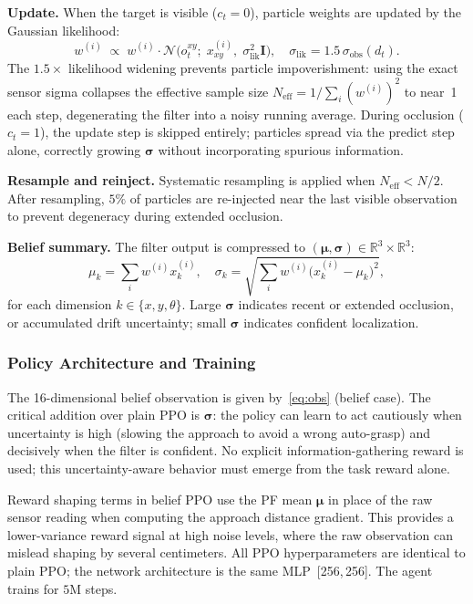 \documentclass[conference]{IEEEtran}
\newcommand{\sigmaobs}{\sigma_{\text{obs}}}
\begin{document}
\textbf{Update.}
When the target is visible ($c_t=0$), particle weights are updated by
the Gaussian likelihood:
\begin{equation}
  w^{(i)} \;\propto\; w^{(i)} \cdot
  \mathcal{N}\!\bigl(o_t^{xy};\;x^{(i)}_{xy},\;
    \sigma_{\text{lik}}^2\mathbf{I}\bigr),
  \quad \sigma_{\text{lik}} = 1.5\,\sigmaobs(d_t).
  \label{eq:pf_update}
\end{equation}
The $1.5\times$ likelihood widening prevents particle impoverishment:
using the exact sensor sigma collapses the effective sample size
$N_{\text{eff}}=1/\!\sum_i(w^{(i)})^2$ to near~1 each step, degenerating
the filter into a noisy running average.
During occlusion ($c_t=1$), the update step is skipped entirely;
particles spread via the predict step alone, correctly growing
$\bm{\sigma}$ without incorporating spurious information.

\textbf{Resample and reinject.}
Systematic resampling is applied when $N_{\text{eff}}<N/2$.
After resampling, $5\%$ of particles are re-injected near the last
visible observation to prevent degeneracy during extended occlusion.

\textbf{Belief summary.}
The filter output is compressed to
$(\bm{\mu},\bm{\sigma})\in\mathbb{R}^3\times\mathbb{R}^3$:
\begin{equation}
  \mu_k = \sum_i w^{(i)} x^{(i)}_k, \quad
  \sigma_k = \sqrt{\sum_i w^{(i)}\bigl(x^{(i)}_k - \mu_k\bigr)^2},
\end{equation}
for each dimension $k\in\{x,y,\theta\}$.
Large $\bm{\sigma}$ indicates recent or extended occlusion, or
accumulated drift uncertainty; small $\bm{\sigma}$ indicates confident
localization.

\subsubsection{Policy Architecture and Training}

The 16-dimensional belief observation is given by~\eqref{eq:obs}
(belief case).
The critical addition over plain PPO is $\bm{\sigma}$: the policy can
learn to act cautiously when uncertainty is high (slowing the approach
to avoid a wrong auto-grasp) and decisively when the filter is confident.
No explicit information-gathering reward is used; this uncertainty-aware
behavior must emerge from the task reward alone.

Reward shaping terms in belief PPO use the PF mean $\bm{\mu}$ in place
of the raw sensor reading when computing the approach distance gradient.
This provides a lower-variance reward signal at high noise levels, where
the raw observation can mislead shaping by several centimeters.
All PPO hyperparameters are identical to plain PPO; the network
architecture is the same MLP~[256,\,256].
The agent trains for $5\text{M}$ steps.
\end{document}
